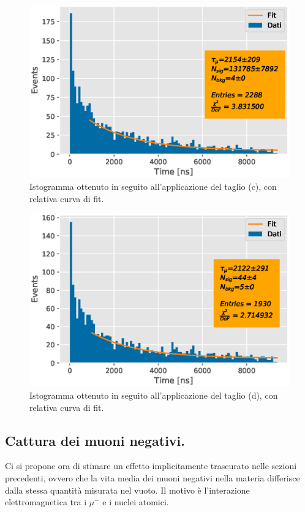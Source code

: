 \documentclass{standalone}
\begin{document}
\begin{figure}[H]
  \centering
  \includegraphics[width=\textwidth]{plots/soft_nopiano1.eps}
  \caption{Istogramma ottenuto in seguito all'applicazione del taglio (c), con relativa curva di fit.}
  \label{fig:taglioc}
\end{figure}

\begin{figure}[H]
  \centering
  \includegraphics[width=\textwidth]{plots/hard_nopiano1.eps}
  \caption{Istogramma ottenuto in seguito all'applicazione del taglio (d), con relativa curva di fit.}
  \label{fig:tagliod}
\end{figure}


\subsection{Cattura dei muoni negativi.}
Ci si propone ora di stimare un effetto implicitamente trascurato nelle sezioni precedenti, ovvero che la vita media dei muoni negativi nella materia differisce dalla stessa quantit\`a misurata nel vuoto. Il motivo \`e l'interazione elettromagnetica tra i $\mu^{-}$ e i nuclei atomici.
\end{document}
